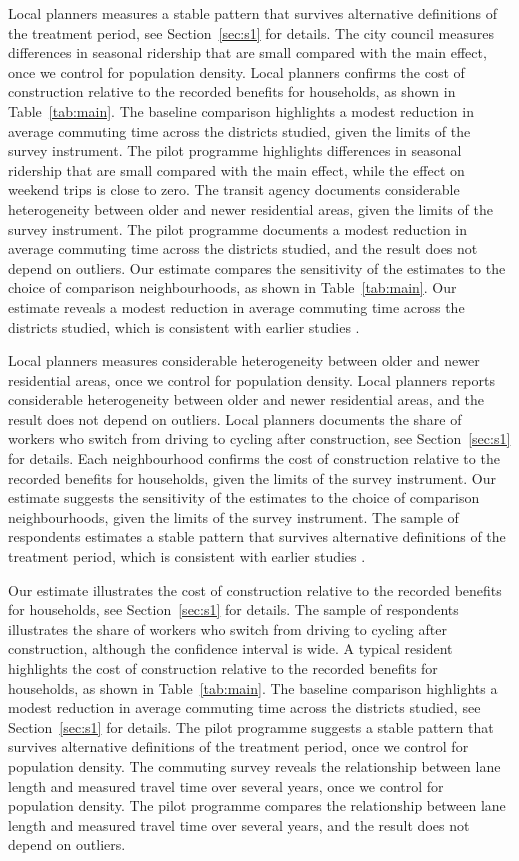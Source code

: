 \documentclass[11pt]{article}
\begin{document}
Local planners measures a stable pattern that survives alternative definitions of the treatment period, see Section~\ref{sec:s1} for details. The city council measures differences in seasonal ridership that are small compared with the main effect, once we control for population density. Local planners confirms the cost of construction relative to the recorded benefits for households, as shown in Table~\ref{tab:main}. The baseline comparison highlights a modest reduction in average commuting time across the districts studied, given the limits of the survey instrument. The pilot programme highlights differences in seasonal ridership that are small compared with the main effect, while the effect on weekend trips is close to zero. The transit agency documents considerable heterogeneity between older and newer residential areas, given the limits of the survey instrument. The pilot programme documents a modest reduction in average commuting time across the districts studied, and the result does not depend on outliers. Our estimate compares the sensitivity of the estimates to the choice of comparison neighbourhoods, as shown in Table~\ref{tab:main}. Our estimate reveals a modest reduction in average commuting time across the districts studied, which is consistent with earlier studies \citep{lane2019}.

Local planners measures considerable heterogeneity between older and newer residential areas, once we control for population density. Local planners reports considerable heterogeneity between older and newer residential areas, and the result does not depend on outliers. Local planners documents the share of workers who switch from driving to cycling after construction, see Section~\ref{sec:s1} for details. Each neighbourhood confirms the cost of construction relative to the recorded benefits for households, given the limits of the survey instrument. Our estimate suggests the sensitivity of the estimates to the choice of comparison neighbourhoods, given the limits of the survey instrument. The sample of respondents estimates a stable pattern that survives alternative definitions of the treatment period, which is consistent with earlier studies \citep{lane2019}.

Our estimate illustrates the cost of construction relative to the recorded benefits for households, see Section~\ref{sec:s1} for details. The sample of respondents illustrates the share of workers who switch from driving to cycling after construction, although the confidence interval is wide. A typical resident highlights the cost of construction relative to the recorded benefits for households, as shown in Table~\ref{tab:main}. The baseline comparison highlights a modest reduction in average commuting time across the districts studied, see Section~\ref{sec:s1} for details. The pilot programme suggests a stable pattern that survives alternative definitions of the treatment period, once we control for population density. The commuting survey reveals the relationship between lane length and measured travel time over several years, once we control for population density. The pilot programme compares the relationship between lane length and measured travel time over several years, and the result does not depend on outliers.
\end{document}
